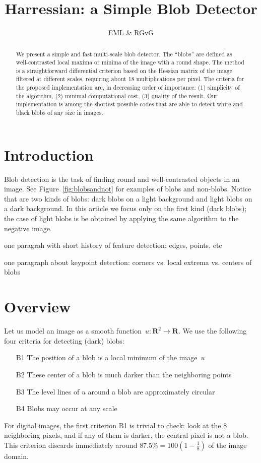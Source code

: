 \documentclass[a4paper]{article}
\title{Harressian: a Simple Blob Detector}
\author{EML \& RGvG}
\def\R{\mathbf{R}}
\begin{document}
\maketitle
\begin{abstract}
	We present a simple and fast multi-scale blob detector.
	The ``blobs'' are defined as well-contrasted local maxima or minima of
	the image with a round shape.
	The method is a straightforward differential criterion based on the
	Hessian matrix of the image filtered at different scales, requiring
	about 18 multiplications per pixel.
	The criteria for the proposed implementation are, in decreasing order
	of importance: (1) simplicity of the algorithm, (2) minimal
	computational cost, (3) quality of the result.
	Our implementation is among the shortest possible codes that
	are able to detect white and black blobs of any size in images.
\end{abstract}

\section{Introduction}

Blob detection is the task of finding round and well-contrasted objects in an
image.  See Figure~\ref{fig:blobsandnot} for examples of blobs and non-blobs.
Notice that are two kinds of blobs: dark blobs on a light background and light
blobs on a dark background.  In this article we focus only on the first kind
(dark blobs); the case of light blobs is be obtained by applying the same
algorithm to the negative image.

one paragrah with short history of feature detection: edges, points, etc

one paragraph about keypoint detection: corners vs. local extrema vs. centers
of blobs

\section{Overview}

Let us model an image as a smooth function~$u:\R^2\to\R$.
We use the following four criteria for detecting (dark) blobs:
\begin{enumerate}
	\item[B1] The position of a blob is a local minimum of the image~$u$
	\item[B2] These center of a blob is much darker than the neighboring points
	\item[B3] The level lines of $u$ around a blob are approximately circular
	\item[B4] Blobs may occur at any scale
\end{enumerate}
For digital images, the first criterion B1 is trivial to check: look at the
8 neighboring pixels, and if any of them is darker, the central pixel is not a
blob.  This criterion discards immediately around
$87.5\%=100\left(1-\frac{1}{8}\right)$ of the image domain.
\end{document}
